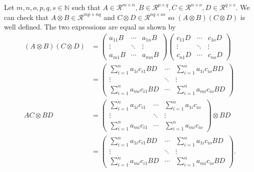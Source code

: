 \begin{solution}
  Let $m,n,o,p,q,s \in \mathbb{N}$ such that
  $A \in \mathcal{R}^{m \times n}, B \in \mathcal{R}^{p \times q}, C \in \mathcal{R}^{n \times o}, D \in \mathcal{R}^{q \times s}$.
  We can check that
  $A \otimes B \in \mathcal{R}^{mp \times nq}$ and
  $C \otimes D \in \mathcal{R}^{nq \times os}$
  so $(A \otimes B) (C \otimes D)$ is well defined.
  The two expressions are equal as shown by
  \begin{align*}
    (A \otimes B) (C \otimes D)
    & =
    \begin{pmatrix}
      a_{11}B & \cdots & a_{1n}B\\
      \vdots  & \ddots & \vdots\\
      a_{m1}B & \cdots & a_{mn}B
    \end{pmatrix}
    \begin{pmatrix}
      c_{11}D & \cdots & c_{1o}D\\
      \vdots  & \ddots & \vdots\\
      c_{n1}D & \cdots & c_{no}D
    \end{pmatrix}\\
    & =
    \begin{pmatrix}
      \sum_{i=1}^n a_{1i}c_{i1}BD & \cdots & \sum_{i=1}^n a_{1i}c_{io}BD\\
      \vdots  & \ddots & \vdots\\
      \sum_{i=1}^n a_{mi}c_{i1}BD & \cdots & \sum_{i=1}^n a_{mi}c_{io}BD
    \end{pmatrix}\\
    AC \otimes BD
    & =
    \begin{pmatrix}
      \sum_{i=1}^n a_{1i}c_{i1} & \cdots & \sum_{i=1}^n a_{1i}c_{io}\\
      \vdots  & \ddots & \vdots\\
      \sum_{i=1}^n a_{mi}c_{i1} & \cdots & \sum_{i=1}^n a_{mi}c_{io}
    \end{pmatrix}
    \otimes BD\\
    & =
    \begin{pmatrix}
      \sum_{i=1}^n a_{1i}c_{i1}BD & \cdots & \sum_{i=1}^n a_{1i}c_{io}BD\\
      \vdots  & \ddots & \vdots\\
      \sum_{i=1}^n a_{mi}c_{i1}BD & \cdots & \sum_{i=1}^n a_{mi}c_{io}BD
    \end{pmatrix}.
  \end{align*}
\end{solution}

